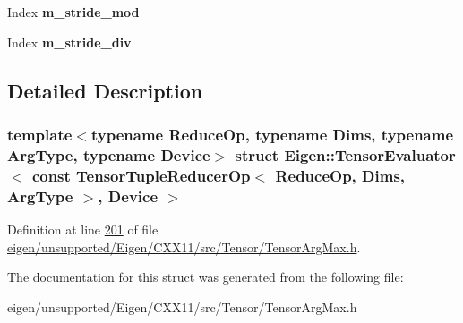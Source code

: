 \begin{DoxyCompactItemize}
Index {\bfseries m\+\_\+stride\+\_\+mod}
\item 
\mbox{\label{struct_eigen_1_1_tensor_evaluator_3_01const_01_tensor_tuple_reducer_op_3_01_reduce_op_00_01_dimsa9704c68eb01932857866cfd0005279c_aa3170e4b091644f32337a4c42b7a2d79}} 
Index {\bfseries m\+\_\+stride\+\_\+div}
\end{DoxyCompactItemize}


\subsection{Detailed Description}
\subsubsection*{template$<$typename Reduce\+Op, typename Dims, typename Arg\+Type, typename Device$>$\newline
struct Eigen\+::\+Tensor\+Evaluator$<$ const Tensor\+Tuple\+Reducer\+Op$<$ Reduce\+Op, Dims, Arg\+Type $>$, Device $>$}



Definition at line \hyperlink{eigen_2unsupported_2_eigen_2_c_x_x11_2src_2_tensor_2_tensor_arg_max_8h_source_l00201}{201} of file \hyperlink{eigen_2unsupported_2_eigen_2_c_x_x11_2src_2_tensor_2_tensor_arg_max_8h_source}{eigen/unsupported/\+Eigen/\+C\+X\+X11/src/\+Tensor/\+Tensor\+Arg\+Max.\+h}.



The documentation for this struct was generated from the following file\+:\begin{DoxyCompactItemize}
\item 
eigen/unsupported/\+Eigen/\+C\+X\+X11/src/\+Tensor/\+Tensor\+Arg\+Max.\+h\end{DoxyCompactItemize}
